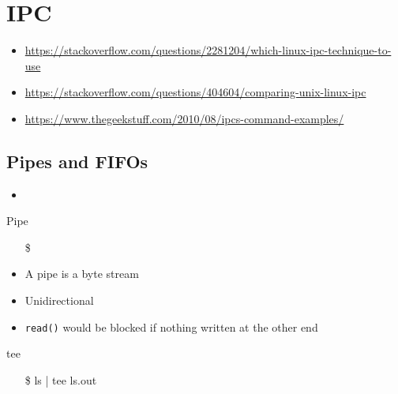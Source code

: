 \section{IPC}
\label{sec:ipc}

\begin{itemize}
\item \url{https://stackoverflow.com/questions/2281204/which-linux-ipc-technique-to-use}
\item \url{https://stackoverflow.com/questions/404604/comparing-unix-linux-ipc}
\item \url{https://www.thegeekstuff.com/2010/08/ipcs-command-examples/}
\end{itemize}

\subsection{Pipes and FIFOs}
\label{sec:pipes-fifos}

\begin{itemize}
\item {}
\end{itemize}

\begin{frame}{Pipe}
  \begin{itemize}
  \item[\$] 
  \end{itemize}
  \begin{center}
  \end{center}
  \begin{itemize}
  \item A pipe is a byte stream
  \item Unidirectional
  \item \texttt{read()} would be blocked if nothing written at the other end
  \end{itemize}
  \ttfamily
  \begin{block}{tee}
    \begin{center}
      \begin{minipage}{.35\linewidth}
        \begin{itemize}
        \item[\$] ls | tee ls.out
        \end{itemize}
      \end{minipage}\quad
      \begin{minipage}{.55\linewidth}
      \end{minipage}
    \end{center}
  \end{block}
\end{frame}

